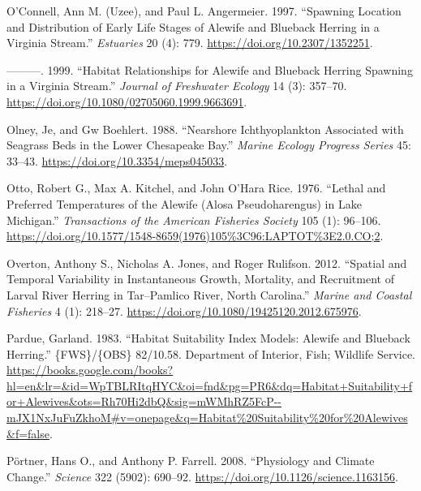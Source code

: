 \documentclass[
]{book}
\newlength{\cslhangindent}
\newlength{\cslentryspacingunit} %
\newenvironment{CSLReferences}[2] %
 {%
  \setlength{\parindent}{0pt}
  \ifodd #1
  \let\oldpar\par
  \def\par{\hangindent=\cslhangindent\oldpar}
  \fi
  \setlength{\parskip}{#2\cslentryspacingunit}
 }%
 {}
\begin{document}
\begin{CSLReferences}{1}{0}
\leavevmode{}%
O'Connell, Ann M. (Uzee), and Paul L. Angermeier. 1997. {``Spawning {Location} and {Distribution} of {Early} {Life} {Stages} of {Alewife} and {Blueback} {Herring} in a {Virginia} {Stream}.''} \emph{Estuaries} 20 (4): 779. \url{https://doi.org/10.2307/1352251}.

\leavevmode{}%
---------. 1999. {``Habitat {Relationships} for {Alewife} and {Blueback} {Herring} {Spawning} in a {Virginia} {Stream}.''} \emph{Journal of Freshwater Ecology} 14 (3): 357--70. \url{https://doi.org/10.1080/02705060.1999.9663691}.

\leavevmode{}%
Olney, Je, and Gw Boehlert. 1988. {``Nearshore Ichthyoplankton Associated with Seagrass Beds in the Lower {Chesapeake} {Bay}.''} \emph{Marine Ecology Progress Series} 45: 33--43. \url{https://doi.org/10.3354/meps045033}.

\leavevmode{}%
Otto, Robert G., Max A. Kitchel, and John O'Hara Rice. 1976. {``Lethal and {Preferred} {Temperatures} of the {Alewife} ({Alosa} Pseudoharengus) in {Lake} {Michigan}.''} \emph{Transactions of the American Fisheries Society} 105 (1): 96--106. \url{https://doi.org/10.1577/1548-8659(1976)105\%3C96:LAPTOT\%3E2.0.CO;2}.

\leavevmode{}%
Overton, Anthony S., Nicholas A. Jones, and Roger Rulifson. 2012. {``Spatial and {Temporal} {Variability} in {Instantaneous} {Growth}, {Mortality}, and {Recruitment} of {Larval} {River} {Herring} in {Tar}--{Pamlico} {River}, {North} {Carolina}.''} \emph{Marine and Coastal Fisheries} 4 (1): 218--27. \url{https://doi.org/10.1080/19425120.2012.675976}.

\leavevmode{}%
Pardue, Garland. 1983. {``Habitat {Suitability} {Index} {Models}: {Alewife} and {Blueback} {Herring}.''} \{FWS\}/\{OBS\} 82/10.58. Department of Interior, Fish; Wildlife Service. \url{https://books.google.com/books?hl=en\&lr=\&id=WpTBLRItqHYC\&oi=fnd\&pg=PR6\&dq=Habitat+Suitability+for+Alewives\&ots=Rh70Hi2dbQ\&sig=mWMhRZ5FcP--mJX1NxJuFuZkhoM\#v=onepage\&q=Habitat\%20Suitability\%20for\%20Alewives\&f=false}.

\leavevmode{}%
Pörtner, Hans O., and Anthony P. Farrell. 2008. {``Physiology and {Climate} {Change}.''} \emph{Science} 322 (5902): 690--92. \url{https://doi.org/10.1126/science.1163156}.


\end{CSLReferences}
\end{document}
